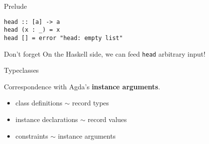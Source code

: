 \documentclass[aspectratio=169]{beamer}
\newcommand\hs[1]{\texttt{#1}}
\begin{document}
\begin{frame}[fragile]{Prelude}
\begin{minipage}{.59\textwidth}
\begin{code}
\>[.][@{}l@{}]\<[679I]%
\>[8]\AgdaSpace{}%
\AgdaSymbol{=}\AgdaSpace{}%
\AgdaSpace{}%
\AgdaSpace{}%
\AgdaSpace{}%
\AgdaSpace{}%
\AgdaSymbol{()}\<%
\end{code}
\end{minipage}\hspace{-1cm}\vrule\hspace{.25cm}
\begin{minipage}{.4\textwidth}%
\begin{verbatim}
head :: [a] -> a
head (x : _) = x
head [] = error "head: empty list"
\end{verbatim}
\begin{alertblock}{Don't forget}
On the Haskell side, we can feed \hs{head} arbitrary input!
\end{alertblock}
\end{minipage}

\end{frame}

\begin{frame}[fragile]{Typeclasses}

Correspondence with Agda's \textbf{instance arguments}.
\begin{itemize}
\item class definitions $\sim$ record types
\item instance declarations $\sim$ record values
\item constraints $\sim$ instance arguments
\end{itemize}

\end{frame}
\end{document}
